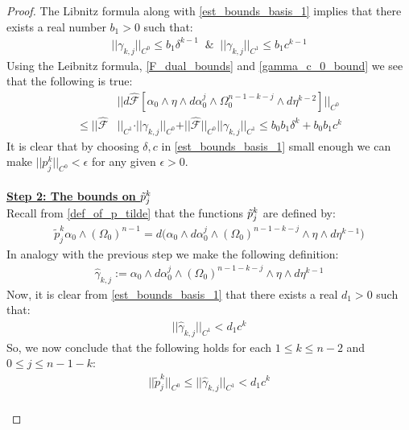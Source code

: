 \documentclass[11pt]{amsart}
\theoremstyle{plain}
\theoremstyle{definition}
\theoremstyle{remark}
\begin{document}
\begin{proof}
The Libnitz formula along with \eqref{est_bounds_basis_1} implies that there exists a real number $b_1>0$ such that:
\begin{align}\label{gamma_c_0_bound}
    \vert\vert\gamma_{k,j}\vert\vert_{C^0} \leq b_1 \delta^{k-1} \; \;  \& \;\; \vert\vert\gamma_{k,j}\vert\vert_{C^1} \leq b_1 c^{k-1}
\end{align} 
Using the Leibnitz formula, \eqref{F_dual_bounds} and \eqref{gamma_c_0_bound} we see that the following is true:
\begin{align}\label{p_kj_bound_1}
    &\vert\vert d\hat{\mathcal{F}}[\alpha_0 \wedge \eta \wedge d\alpha^j_0 \wedge \Omega^{n-1-k-j}_0 \wedge d\eta^{k-2}]\vert\vert_{C^0} \\\nonumber \leq
     \vert\vert\hat{\mathcal{F}}&\vert\vert_{C^1} \cdot \vert\vert\gamma_{k,j}\vert\vert_{C^0} + \vert\vert\hat{\mathcal{F}}\vert\vert_{C^0} \vert\vert\gamma_{k,j}\vert\vert_{C^1} \leq b_0b_1 \delta^k + b_0b_1 c^k
\end{align} 
It is clear that by choosing $\delta, c$ in \eqref{est_bounds_basis_1} small enough we can make $\vert\vert p^k_{j}\vert\vert_{C^0} < \epsilon$ for any given $\epsilon >0$.\\
\\
\textbf{\underline{Step 2: The bounds on $\Tilde{p}^{k}_{j}$}}
\\
Recall from \eqref{def_of_p_tilde} that the functions $\Tilde{p}^k_j$ are defined by:
\begin{align*}
     \tilde{p}^k_j \alpha_0 \wedge (\Omega_0)^{n-1} = d\big(\alpha_0 \wedge d\alpha^j_0 \wedge (\Omega_0)^{n-1-k-j}\wedge \eta \wedge d\eta^{k-1}\big)
\end{align*}
In analogy with the previous step we make the following definition:
\begin{align}
    \hat{\gamma}_{k,j}:= \alpha_0 \wedge d\alpha^j_0 \wedge (\Omega_0)^{n-1-k-j}\wedge \eta \wedge d\eta^{k-1}
\end{align}
Now, it is clear from \eqref{est_bounds_basis_1} that there exists a real $d_1 >0$ such that:
\begin{align}
    \vert\vert\hat{\gamma}_{k,j}\vert\vert_{C^1} < d_1c^k
\end{align}
So, we now conclude that the following holds for each $1 \leq k \leq n-2$ and $0\leq j \leq n-1-k$:
\begin{align}
\vert\vert \tilde{p}^k_j\vert\vert_{C^0} \leq  \vert\vert\hat{\gamma}_{k,j}\vert\vert_{C^1} <  d_1c^{k}
\end{align}
\\

\end{proof}
\end{document}
